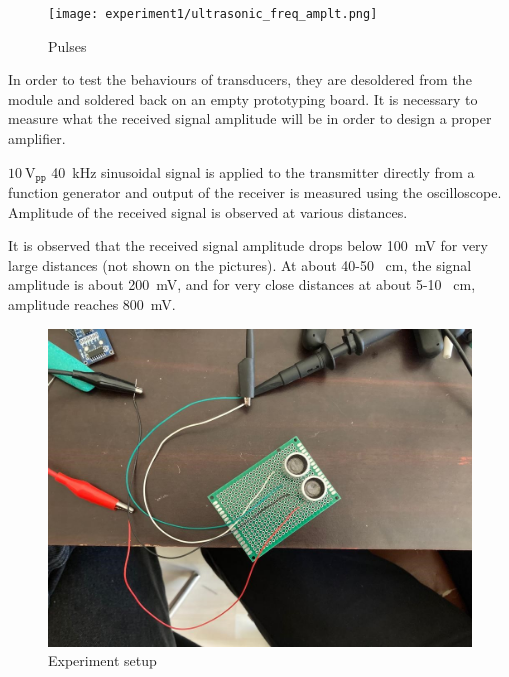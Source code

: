 \documentclass[12pt, a4paper]{article}
\begin{document}
        \begin{figure}[H]\centering
            \texttt{[image: experiment1/ultrasonic\_freq\_amplt.png]}
            \caption[]{Pulses}\label{fig:pulses}
        \end{figure}



        \pagebreak
        In order to test the behaviours of transducers, they are desoldered from the module and soldered back on an empty prototyping board. It is necessary to measure what the received signal amplitude will be in order to design a proper amplifier.

        $\SI{10}{\volt}_{\texttt{pp}}$ \SI{40}{\kilo\hertz} sinusoidal signal is applied to the transmitter directly from a function generator and output of the receiver is measured using the oscilloscope. Amplitude of the received signal is observed at various distances. 

        It is observed that the received signal amplitude drops below \SI{100}{\milli\volt} for very large distances (not shown on the pictures). At about 40-50 \SI{}{\centi\metre}, the signal amplitude is about \SI{200}{\milli\volt}, and for very close distances at about 5-10 \SI{}{\centi\metre}, amplitude reaches \SI{800}{\milli\volt}. 

        \begin{figure}[H]\centering
            \includegraphics[width=\textwidth]{experiment2/setup.jpg}
            \caption[]{Experiment setup}\label{fig:setup}
        \end{figure}
\end{document}

